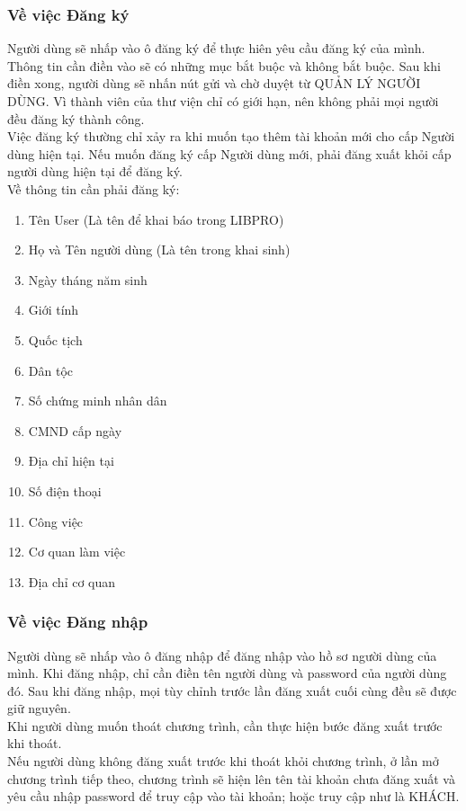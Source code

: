 \documentclass[12pt,a4paper]{report}
\begin{document}
            \subsubsection{Về việc Đăng ký}
            Người dùng sẽ nhấp vào ô đăng ký để thực hiên yêu cầu đăng ký của mình. Thông tin cần điền vào sẽ có những mục bắt buộc và không bắt buộc. Sau khi điền xong, người dùng sẽ nhấn nút gửi và chờ duyệt từ QUẢN LÝ NGƯỜI DÙNG. Vì thành viên của thư viện chỉ có giới hạn, nên không phải mọi người đều đăng ký thành công.\\
            Việc đăng ký thường chỉ xảy ra khi muốn tạo thêm tài khoản mới cho cấp Người dùng hiện tại. Nếu muốn đăng ký cấp Người dùng mới, phải đăng xuất khỏi cấp người dùng hiện tại để đăng ký.\\
            Về thông tin cần phải đăng ký:
            \begin{enumerate}
                \item Tên User (Là tên để khai báo trong LIBPRO)
                \item Họ và Tên người dùng (Là tên trong khai sinh)
                \item Ngày tháng năm sinh
                \item Giới tính
                \item Quốc tịch
                \item Dân tộc
                \item Số chứng minh nhân dân
                \item CMND cấp ngày
                \item Địa chỉ hiện tại
                \item Số điện thoại
                \item Công việc
                \item Cơ quan làm việc
                \item Địa chỉ cơ quan
            \end{enumerate}
            \subsubsection{Về việc Đăng nhập}
            Người dùng sẽ nhấp vào ô đăng nhập để đăng nhập vào hồ sơ người dùng của mình. Khi đăng nhập, chỉ cần điền tên người dùng và password của người dùng đó. Sau khi đăng nhập, mọi tùy chỉnh trước lần đăng xuất cuối cùng đều sẽ được giữ nguyên.\\
            Khi người dùng muốn thoát chương trình, cần thực hiện bước đăng xuất trước khi thoát.\\
            Nếu người dùng không đăng xuất trước khi thoát khỏi chương trình, ở lần mở chương trình tiếp theo, chương trình sẽ hiện lên tên tài khoản chưa đăng xuất và yêu cầu nhập password để truy cập vào tài khoản; hoặc truy cập như là KHÁCH.\\
\end{document}
